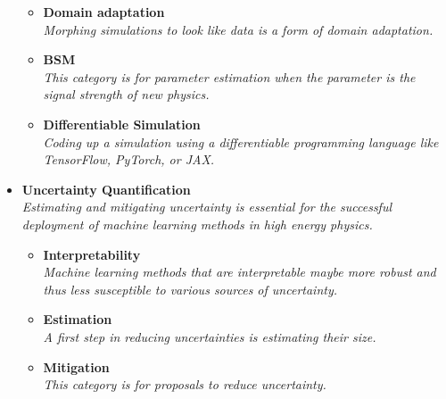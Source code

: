 \documentclass[12pt,letterpaper]{article}
\begin{document}
\begin{itemize}
\begin{itemize}
		\item \textbf{Domain adaptation}~\cite{Rogozhnikov:2016bdp,Andreassen:2019nnm,Cranmer:2015bka,2009.03796,Nachman:2021opi,Camaiani:2022kul,Schreck:2023pzs,Algren:2023qnb}
		\\\textit{Morphing simulations to look like data is a form of domain adaptation.}
		\item \textbf{BSM}~\cite{Andreassen:2020nkr,Hollingsworth:2020kjg,Brehmer:2018kdj,Brehmer:2018eca,Brehmer:2018hga,Brehmer:2019xox,Romao:2020ojy,deSouza:2022uhk,GomezAmbrosio:2022mpm,Castro:2022zpq,Anisha:2023xmh,Dennis:2023kfe,vanBeekveld:2023ney,Chhibra:2023tyf,Mandal:2023mck,Franz:2023gic,Arganda:2023qni}
		\\\textit{This category is for parameter estimation when the parameter is the signal strength of new physics.}
		\item \textbf{Differentiable Simulation}~\cite{Heinrich:2022xfa,MODE:2022znx,Nachman:2022jbj,Lei:2022dvn,Napolitano:2023jhg,Shenoy:2023ros,Kagan:2023gxz,Aehle:2023wwi,Smith:2023ssh}
		\\\textit{Coding up a simulation using a differentiable programming language like TensorFlow, PyTorch, or JAX.}
	\end{itemize}
\item \textbf{Uncertainty Quantification}
\\\textit{Estimating and mitigating uncertainty is essential for the successful deployment of machine learning methods in high energy physics. }
	\begin{itemize}
		\item \textbf{Interpretability}~\cite{deOliveira:2015xxd,Chang:2017kvc,Diefenbacher:2019ezd,Agarwal:2020fpt,Grojean:2020ech,Romero:2021qlf,Collins:2021pld,Mokhtar:2021bkf,Bradshaw:2022qev,Anzalone:2022hrt,Grojean:2022mef,Khot:2022aky,Roy:2022gge,Mengel:2023mnw}
		\\\textit{Machine learning methods that are interpretable maybe more robust and thus less susceptible to various sources of uncertainty.}
		\item \textbf{Estimation}~\cite{Nachman:2019dol,Nachman:2019yfl,Barnard:2016qma,Bellagente:2021yyh,Cheung:2022dil,Koh:2023wst,Golutvin:2023fle}
		\\\textit{A first step in reducing uncertainties is estimating their size.}
		\item \textbf{Mitigation}~\cite{Estrade:DLPS2017,Englert:2018cfo,Louppe:2016ylz,Araz:2021wqm,Stein:2022nvf}
		\\\textit{This category is for proposals to reduce uncertainty.}

\end{itemize}
\end{itemize}
\end{document}
